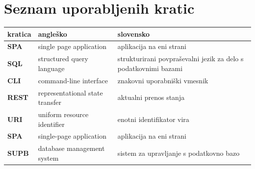 \documentclass[a4paper, 12pt]{book}
\newcommand{\clearemptydoublepage}{\newpage{\pagestyle{empty}\cleardoublepage}}
\begin{document}
\clearemptydoublepage


\pagestyle{empty}
\def\thepage{}%
\tableofcontents{}

\clearemptydoublepage


\chapter*{Seznam uporabljenih kratic}  %

\noindent\begin{tabular}{p{}|p{}|p{}}    %
  {\bf kratica} & {\bf angleško}                             & {\bf slovensko} \\ \hline
  {\bf SPA}      & single page application               &  aplikacija na eni strani \\
  {\bf SQL} & structured query language & strukturirani povpraševalni jezik za delo s podatkovnimi bazami  \\
  {\bf CLI}   & command-line interface              & znakovni uporabniški vmesnik \\
  {\bf REST}   & representational state transfer              & aktualni prenos stanja \\
  {\bf URI}   &  uniform resource identifier              & enotni identifikator vira \\
  {\bf SPA}   &  single-page application              & aplikacija na eni strani \\
  {\bf SUPB}   &  database management system              & sistem za upravljanje s podatkovno bazo \\
\end{tabular}
\end{document}
